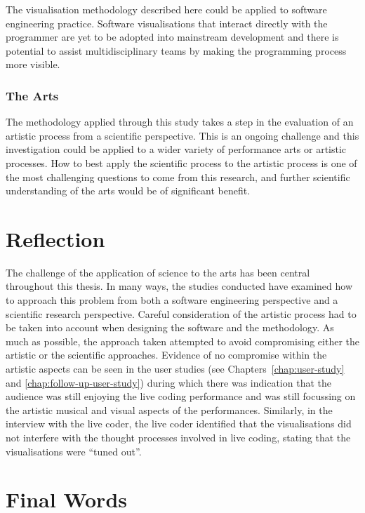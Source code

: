 The visualisation methodology described here could be applied to software engineering practice. Software visualisations that interact directly with the programmer are yet to be adopted into mainstream development and there is potential to assist multidisciplinary teams by making the programming process more visible.

\subsubsection{The Arts}

The methodology applied through this study takes a step in the evaluation of an artistic process from a scientific perspective. This is an ongoing challenge and this investigation could be applied to a wider variety of performance arts or artistic processes. How to best apply the scientific process to the artistic process is one of the most challenging questions to come from this research, and further scientific understanding of the arts would be of significant benefit.

\section{Reflection}

The challenge of the application of science to the arts has been central throughout this thesis. In many ways, the studies conducted have examined how to approach this problem from both a software engineering perspective and a scientific research perspective. Careful consideration of the artistic process had to be taken into account when designing the software and the methodology. As much as possible, the approach taken attempted to avoid compromising either the artistic or the scientific approaches. Evidence of no compromise within the artistic aspects can be seen in the user studies (see Chapters~\ref{chap:user-study} and \ref{chap:follow-up-user-study}) during which there  was indication that the audience was still enjoying the live coding performance and was still focussing on the artistic musical and visual aspects of the performances. Similarly, in the interview with the live coder, the live coder identified that the visualisations did not interfere with the thought processes involved in live coding, stating that the visualisations were ``tuned out''.

\section{Final Words}

